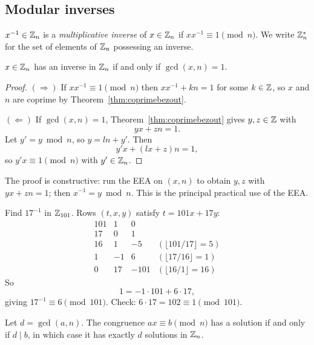 \documentclass[11pt]{article}
\begin{document}
\subsection{Modular inverses}
\label{sec:modinv}

\begin{definition}
$x^{-1}\in\mathbb{Z}_n$ is a \emph{multiplicative inverse} of $x\in\mathbb{Z}_n$ if $xx^{-1}\equiv1\pmod n$. We write $\mathbb{Z}_n^*$ for the set of elements of $\mathbb{Z}_n$ possessing an inverse.
\end{definition}

\begin{theorem}
\label{thm:inverse}
$x\in\mathbb{Z}_n$ has an inverse in $\mathbb{Z}_n$ if and only if $\gcd(x,n)=1$.
\end{theorem}

\begin{proof}
\noindent$(\Rightarrow)$ If $xx^{-1}\equiv1\pmod n$ then $xx^{-1}+kn=1$ for some $k\in\mathbb{Z}$, so $x$ and $n$ are coprime by Theorem~\ref{thm:coprimebezout}.

\medskip
\noindent$(\Leftarrow)$ If $\gcd(x,n)=1$, Theorem~\ref{thm:coprimebezout} gives $y,z\in\mathbb{Z}$ with
\[
yx+zn=1.
\]
Let $y'=y\bmod n$, so $y=ln+y'$. Then
\[
y'x+(lx+z)n=1,
\]
so $y'x\equiv1\pmod n$ with $y'\in\mathbb{Z}_n$.
\end{proof}

\begin{note}
The proof is constructive: run the EEA on $(x,n)$ to obtain $y,z$ with $yx+zn=1$; then $x^{-1}=y\bmod n$. This is the principal practical use of the EEA.
\end{note}

\begin{example}
Find $17^{-1}$ in $\mathbb{Z}_{101}$. Rows $(t,x,y)$ satisfy $t=101x+17y$:
\[
\begin{array}{rrrl}
101 & 1 & 0 &\\
17 & 0 & 1 &\\
16 & 1 & -5 & (\lfloor101/17\rfloor=5)\\
1 & -1 & 6 & (\lfloor17/16\rfloor=1)\\
0 & 17 & -101 & (\lfloor16/1\rfloor=16)
\end{array}
\]
So
\[
1=-1\cdot101+6\cdot17,
\]
giving $17^{-1}\equiv6\pmod{101}$. Check: $6\cdot17=102\equiv1\pmod{101}$.
\end{example}

\begin{theorem}
\label{thm:lincong}
Let $d=\gcd(a,n)$. The congruence $ax\equiv b\pmod n$ has a solution if and only if $d\mid b$, in which case it has exactly $d$ solutions in $\mathbb{Z}_n$.
\end{theorem}
\end{document}
